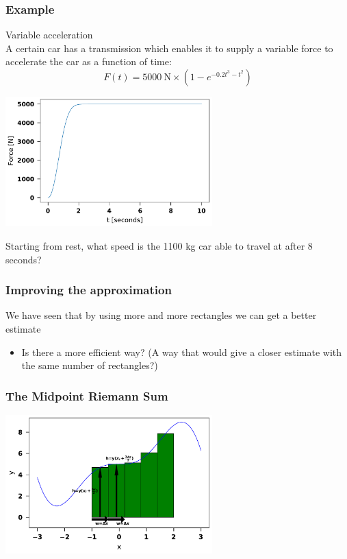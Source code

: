 \documentclass{beamer}
\begin{document}
	\begin{frame}
	\frametitle{Example}
	Variable acceleration\\
	A certain car has a transmission which enables it to supply a variable force to accelerate the car as a function of time:
	\begin{equation*}
		F(t)=5000\ \mathrm{N} \times (1-e^{-0.2t^3-t^2})
	\end{equation*}
	\begin{center}
		\includegraphics[width=8cm]{variable_force.pdf}
	\end{center}
	Starting from rest, what speed is the 1100 kg car able to travel at after 8 seconds?
\end{frame}

	\begin{frame}
		\frametitle{Improving the approximation}
		We have seen that by using more and more rectangles we can get a better estimate
		\begin{itemize}
			\item <2-> Is there a more efficient way? (A way that would give a closer estimate with the same number of rectangles?)
		\end{itemize}
	\end{frame}

\begin{frame}
	\frametitle{The Midpoint Riemann Sum}
	\begin{center}
		\includegraphics[width=8cm]{reimann_4.pdf}
	\end{center}
\end{frame}
\end{document}
